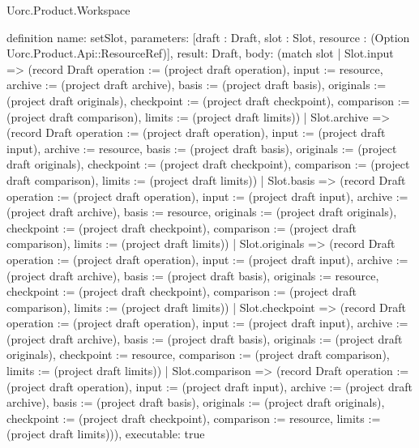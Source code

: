 \begin{lexlean}{Uorc.Product.Workspace}
\begin{semanticmodule}
definition{
  name: setSlot,
  parameters: [draft : Draft, slot : Slot, resource : (Option Uorc.Product.Api::ResourceRef)],
  result: Draft,
  body: (match slot
    | Slot.input => (record Draft {operation := (project draft operation), input := resource, archive := (project draft archive), basis := (project draft basis), originals := (project draft originals), checkpoint := (project draft checkpoint), comparison := (project draft comparison), limits := (project draft limits)})
    | Slot.archive => (record Draft {operation := (project draft operation), input := (project draft input), archive := resource, basis := (project draft basis), originals := (project draft originals), checkpoint := (project draft checkpoint), comparison := (project draft comparison), limits := (project draft limits)})
    | Slot.basis => (record Draft {operation := (project draft operation), input := (project draft input), archive := (project draft archive), basis := resource, originals := (project draft originals), checkpoint := (project draft checkpoint), comparison := (project draft comparison), limits := (project draft limits)})
    | Slot.originals => (record Draft {operation := (project draft operation), input := (project draft input), archive := (project draft archive), basis := (project draft basis), originals := resource, checkpoint := (project draft checkpoint), comparison := (project draft comparison), limits := (project draft limits)})
    | Slot.checkpoint => (record Draft {operation := (project draft operation), input := (project draft input), archive := (project draft archive), basis := (project draft basis), originals := (project draft originals), checkpoint := resource, comparison := (project draft comparison), limits := (project draft limits)})
    | Slot.comparison => (record Draft {operation := (project draft operation), input := (project draft input), archive := (project draft archive), basis := (project draft basis), originals := (project draft originals), checkpoint := (project draft checkpoint), comparison := resource, limits := (project draft limits)})),
  executable: true
}


\end{semanticmodule}
\end{lexlean}
